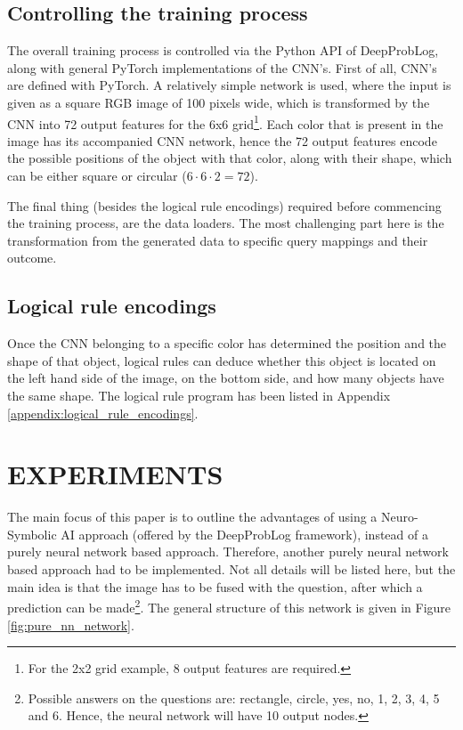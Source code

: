 \documentclass[english]{sobraep}
\begin{document}
\subsection{Controlling the training process}
The overall training process is controlled via the Python API of DeepProbLog, along with general PyTorch implementations of the CNN's.
First of all, CNN's are defined with PyTorch. A relatively simple network is used, where the input is given as a square RGB image of 100 pixels wide, which is transformed by the CNN into 72 output features for the 6x6 grid\footnote{For the 2x2 grid example, 8 output features are required.}. Each color that is present in the image has its accompanied CNN network, hence the 72 output features encode the possible positions of the object with that color, along with their shape, which can be either square or circular ($6 \cdot 6 \cdot 2 = 72$).

The final thing (besides the logical rule encodings) required before commencing the training process, are the data loaders. The most challenging part here is the transformation from the generated data to specific query mappings and their outcome. 

\subsection{Logical rule encodings}
Once the CNN belonging to a specific color has determined the position and the shape of that object, logical rules can deduce whether this object is located on the left hand side of the image, on the bottom side, and how many objects have the same shape. The logical rule program has been listed in Appendix \ref{appendix:logical_rule_encodings}.

\section{EXPERIMENTS}
\label{sec:experiments}
The main focus of this paper is to outline the advantages of using a Neuro-Symbolic AI approach (offered by the DeepProbLog framework), instead of a purely neural network based approach. Therefore, another purely neural network based approach had to be implemented. Not all details will be listed here, but the main idea is that the image has to be fused with the question, after which a prediction can be made\footnote{Possible answers on the questions are: rectangle, circle, yes, no, 1, 2, 3, 4, 5 and 6. Hence, the neural network will have 10 output nodes.}. The general structure of this network is given in Figure \ref{fig:pure_nn_network}.
\end{document}
